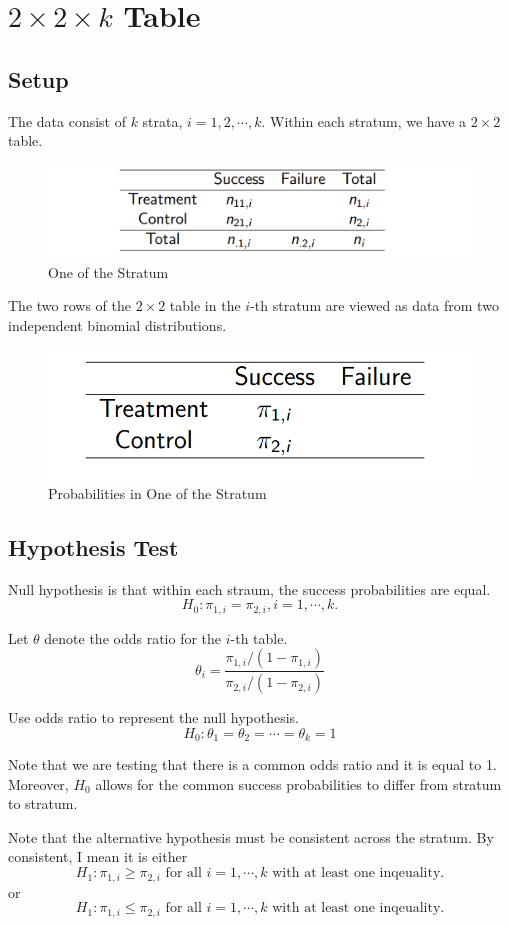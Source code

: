 \section{$2 \times 2 \times k$ Table}
\subsection{Setup}
The data consist of $k$ strata, $i = 1, 2, \cdots, k$. Within each stratum, we have a $2 \times 2$ table.
\begin{figure}[H]
	\centering
	\includegraphics[width=0.7\linewidth]{fig/screenshot004}
	\caption{One of the Stratum}
	\label{fig:screenshot005}
\end{figure}
The two rows of the $2 \times 2$ table in the $i$-th stratum are viewed
as data from two independent binomial distributions.

\begin{figure}[H]
	\centering
	\includegraphics[width=0.5\linewidth]{fig/screenshot006}
	\caption{Probabilities in One of the Stratum}
	\label{fig:screenshot006}
\end{figure}

\subsection{Hypothesis Test}
Null hypothesis is that within each straum, the success probabilities are equal.
\[H_0: \pi_{1, i} = \pi_{2, i}, i = 1, \cdots, k.\]

Let $\theta$ denote the odds ratio for the $i$-th table.
\[\theta_i = \frac{\pi_{1, i}/ (1 - \pi_{1, i})}{\pi_{2,i}/ (1 - \pi_{2, i})}\]

Use odds ratio to represent the null hypothesis.
\[H_0: \theta_1 = \theta_2 = \cdots = \theta_k = 1\]

Note that we are testing that there is a common odds ratio and it is equal
to 1.
Moreover, $H_0$ allows for the common success probabilities to differ from
stratum to stratum.

Note that the alternative hypothesis must be consistent across the stratum. By consistent, I mean it is either
\[H_1: \pi_{1,i} \ge \pi_{2,i} \text{ for all } i = 1, \cdots, k \text{ with at least one inqeuality.}\]
or
\[H_1: \pi_{1,i} \le \pi_{2,i} \text{ for all } i = 1, \cdots, k \text{ with at least one inqeuality.}\]